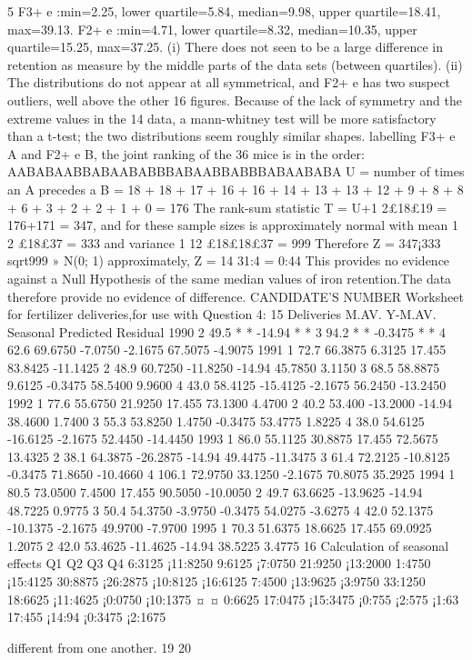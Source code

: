 \documentclass[a4paper,12pt]{article}
\begin{document}
5 F3+
e :min=2.25, lower quartile=5.84, median=9.98, upper quartile=18.41, max=39.13.
F2+
e :min=4.71, lower quartile=8.32, median=10.35, upper quartile=15.25, max=37.25.
(i) There does not seen to be a large difference in retention as measure by the middle parts
of the data sets (between quartiles).
(ii) The distributions do not appear at all symmetrical, and F2+
e has two suspect outliers, well
above the other 16 figures. Because of the lack of symmetry and the extreme values in the
14
data, a mann-whitney test will be more satisfactory than a t-test; the two distributions
seem roughly similar shapes. labelling F3+
e A and F2+
e B, the joint ranking of the 36
mice is in the order:
AABABAABBABAABABBBABAABBABBBABAABABA
U = number of times an A precedes a B
= 18 + 18 + 17 + 16 + 16 + 14 + 13 + 13 + 12 + 9 + 8 + 8 + 6 + 3 + 2 + 2 + 1 + 0 = 176
The rank-sum statistic T = U+1
2£18£19 = 176+171 = 347, and for these sample sizes is
approximately normal with mean 1
2 £18£37 = 333 and variance 1
12 £18£18£37 = 999
Therefore Z = 347¡333
sqrt999 » N(0; 1) approximately, Z = 14
31:4 = 0:44 This provides no
evidence against a Null Hypothesis of the same median values of iron retention.The data
therefore provide no evidence of difference.
CANDIDATE’S NUMBER
Worksheet for fertilizer deliveries,for use with Question 4:
15
Deliveries M.AV. Y-M.AV. Seasonal Predicted Residual
1990 2 49.5 * * -14.94 * *
3 94.2 * * -0.3475 * *
4 62.6 69.6750 -7.0750 -2.1675 67.5075 -4.9075
1991 1 72.7 66.3875 6.3125 17.455 83.8425 -11.1425
2 48.9 60.7250 -11.8250 -14.94 45.7850 3.1150
3 68.5 58.8875 9.6125 -0.3475 58.5400 9.9600
4 43.0 58.4125 -15.4125 -2.1675 56.2450 -13.2450
1992 1 77.6 55.6750 21.9250 17.455 73.1300 4.4700
2 40.2 53.400 -13.2000 -14.94 38.4600 1.7400
3 55.3 53.8250 1.4750 -0.3475 53.4775 1.8225
4 38.0 54.6125 -16.6125 -2.1675 52.4450 -14.4450
1993 1 86.0 55.1125 30.8875 17.455 72.5675 13.4325
2 38.1 64.3875 -26.2875 -14.94 49.4475 -11.3475
3 61.4 72.2125 -10.8125 -0.3475 71.8650 -10.4660
4 106.1 72.9750 33.1250 -2.1675 70.8075 35.2925
1994 1 80.5 73.0500 7.4500 17.455 90.5050 -10.0050
2 49.7 63.6625 -13.9625 -14.94 48.7225 0.9775
3 50.4 54.3750 -3.9750 -0.3475 54.0275 -3.6275
4 42.0 52.1375 -10.1375 -2.1675 49.9700 -7.9700
1995 1 70.3 51.6375 18.6625 17.455 69.0925 1.2075
2 42.0 53.4625 -11.4625 -14.94 38.5225 3.4775
16
Calculation of seasonal effects
Q1 Q2 Q3 Q4
6:3125 ¡11:8250 9:6125 ¡7:0750
21:9250 ¡13:2000 1:4750 ¡15:4125
30:8875 ¡26:2875 ¡10:8125 ¡16:6125
7:4500 ¡13:9625 ¡3:9750 33:1250
18:6625 ¡11:4625 ¡0:0750 ¡10:1375
¤ ¤ 0:6625
17:0475 ¡15:3475 ¡0:755 ¡2:575 ¡1:63
17:455 ¡14:94 ¡0:3475 ¡2:1675

different from one another.
19
20
\end{document}

